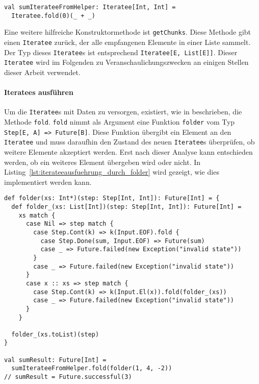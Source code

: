 \documentclass[draft=false
              ,paper=a4
              ,twoside=false
              ,fontsize=11pt
              ,headsepline
              ,BCOR10mm
              ,DIV11
              ]{scrbook}
\begin{document}
\begin{lstlisting}[caption=Erstellung eines Iteratees durch Konstruktormethode im Companion-Objekt, label=lst:iteratee_durch_hilfsmethode]
val sumIterateeFromHelper: Iteratee[Int, Int] =
  Iteratee.fold(0)(_ + _)
\end{lstlisting}

Eine weitere hilfreiche Konstruktormethode ist \lstinline|getChunks|.
Diese Methode gibt einen \lstinline|Iteratee| zurück, der alle empfangenen Elemente in einer Liste sammelt.
Der Typ dieses \lstinline|Iteratee|s ist entsprechend \lstinline|Iteratee[E, List[E]]|.
Dieser \lstinline|Iteratee| wird im Folgenden zu Veranschaulichungszwecken an einigen Stellen dieser Arbeit verwendet.



\paragraph{Iteratees ausführen} %
\label{par:iteratees_ausfuehren}\mbox{} %

Um die \lstinline|Iteratee|s mit Daten zu versorgen, existiert, wie in  beschrieben, die Methode \lstinline|fold|.
\lstinline|fold| nimmt als Argument eine Funktion \lstinline|folder| vom Typ \lstinline[breaklines=true]|Step[E, A] => Future[B]|.
Diese Funktion übergibt ein Element an den \lstinline|Iteratee| und muss daraufhin den Zustand des neuen \lstinline|Iteratee|s überprüfen, ob weitere Elemente akzeptiert werden.
Erst nach dieser Analyse kann entschieden werden, ob ein weiteres Element übergeben wird oder nicht.
In Listing~\ref{lst:iterateeausfuehrung_durch_folder} wird gezeigt, wie dies implementiert werden kann.

\begin{lstlisting}[caption=Ausführung eines Iteratees durch folder-Funktion, label=lst:iterateeausfuehrung_durch_folder]
def folder(xs: Int*)(step: Step[Int, Int]): Future[Int] = {
  def folder_(xs: List[Int])(step: Step[Int, Int]): Future[Int] =
    xs match {
      case Nil => step match {
        case Step.Cont(k) => k(Input.EOF).fold {
          case Step.Done(sum, Input.EOF) => Future(sum)
          case _ => Future.failed(new Exception("invalid state"))
        }
        case _ => Future.failed(new Exception("invalid state"))
      }
      case x :: xs => step match {
        case Step.Cont(k) => k(Input.El(x)).fold(folder_(xs))
        case _ => Future.failed(new Exception("invalid state"))
      }
    }

  folder_(xs.toList)(step)
}

val sumResult: Future[Int] =
  sumIterateeFromHelper.fold(folder(1, 4, -2))
// sumResult = Future.successful(3)
\end{lstlisting}
\end{document}

